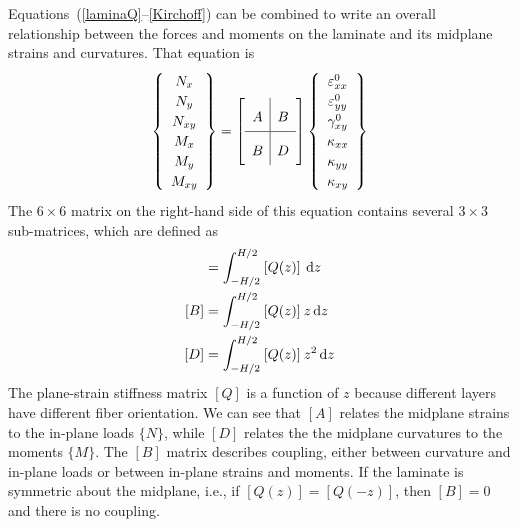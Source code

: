 \documentclass[11pt]{article}
\begin{document}
Equations~(\ref{laminaQ}--\ref{Kirchoff}) can be combined to write an overall relationship between the forces and moments on the laminate and its midplane strains and curvatures.  That equation is
\begin{equation}
\renewcommand\arraystretch{1.2}
   \left\{ \begin{array}{c}
     N_x \\ N_y \\ N_{xy} \\  M_x \\ M_y \\ M_{xy}
   \end{array} \right\}
   =
\renewcommand\arraystretch{2}
   \left[ \begin{array}{c|c}
            A & B \\
            \hline
            B & D
      \end{array} \right]
\renewcommand\arraystretch{1.2}
        \left\{ \begin{array}{c}
           \varepsilon^0_{xx}  \\  \varepsilon^0_{yy}  \\  \gamma^0_{xy}  \\ \kappa_{xx}  \\  \kappa_{yy}  \\  \kappa_{xy}
           \end{array} \right\}
     \label{laminateStiffness}     
\end{equation}
The $6 \times 6$ matrix on the right-hand side of this equation contains several $3 \times 3$ sub-matrices, which are defined as
\begin{align}
     [A] &= \int_{-H/2}^{H/2} \: [Q(z)] \: \ud z  \label{Amatrix} \\
     [B] &= \int_{-H/2}^{H/2} \: [Q(z)] \: z \ud z \label{Bmatrix}  \\
     [D] &= \int_{-H/2}^{H/2}\: [Q(z)] \: z^2 \ud z  \label{Dmatrix}
\end{align}
The plane-strain stiffness matrix $[Q]$ is a function of $z$ because different layers have different fiber orientation.  We can see that $[A]$ relates the midplane strains to the in-plane loads $\{ N \}$, while $[D]$ relates the the midplane curvatures to the moments $\{ M \}$.  The $[B]$ matrix describes coupling, either between curvature and in-plane loads or between in-plane strains and moments.  If the laminate is symmetric about the midplane, i.e., if $[Q(z)] = [Q(-z)]$, then $[B] = 0$ and there is no coupling.  
\end{document}
